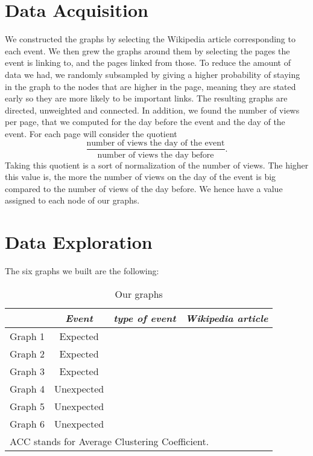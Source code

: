 \documentclass[conference]{IEEEtran}
\begin{document}
\section{Data Acquisition}

We constructed the graphs by selecting the Wikipedia article corresponding to each event. We then grew the graphs around them by selecting the pages the event is linking to, and the pages linked from those. To reduce the amount of data we had, we randomly subsampled by giving a higher probability of staying in the graph to the nodes that are higher in the page, meaning they are stated early so they are more likely to be important links. The resulting graphs are directed, unweighted and connected. In addition, we found the number of views per page, that we computed for the day before the event and the day of the event. 
For each page will consider the quotient \[\frac{\text{number of views the day of the event} }{\text{number of views the day before}}.\]  Taking this quotient is a sort of normalization of the number of views. The higher this value is, the more the number of views on the day of the event is big compared to the number of views of the day before. We hence have a value assigned to each node of our graphs. 


\section{Data Exploration}


The six graphs we built are the following: 

\begin{table}[htbp]
\caption{Our graphs}
\begin{center}
\begin{tabular}{|c|c|c|c|}
\hline
\textbf{ } & \textbf{\textit{Event}}& \textbf{\textit{type of event}}& \textbf{\textit{Wikipedia article}} \\
\hline
Graph 1 & Expected & & \\
\hline
Graph 2& Expected & & \\
\hline
Graph 3&  Expected& & \\
\hline
Graph 4& Unexpected& & \\
\hline
Graph 5& Unexpected& & \\
\hline
Graph 6 & Unexpected & & \\
\hline
\multicolumn{4}{l}{ACC stands for Average Clustering Coefficient.} \\
\end{tabular}
\end{center}
\end{table}
\end{document}
